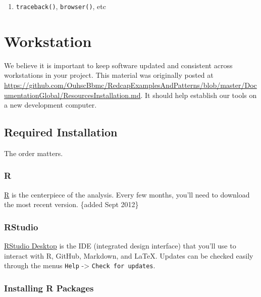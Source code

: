 \documentclass[
]{book}
\providecommand{\tightlist}{%
  \setlength{\itemsep}{0pt}\setlength{\parskip}{0pt}}
\begin{document}
\begin{enumerate}
\def\labelenumi{\arabic{enumi}.}
\tightlist
\item
  \texttt{traceback()}, \texttt{browser()}, etc
\end{enumerate}

\hypertarget{workstation}{%
\chapter{Workstation}\label{workstation}}

We believe it is important to keep software updated and consistent across workstations in your project. This material was originally posted at \url{https://github.com/OuhscBbmc/RedcapExamplesAndPatterns/blob/master/DocumentationGlobal/ResourcesInstallation.md}. It should help establish our tools on a new development computer.

\hypertarget{installation-required}{%
\section{Required Installation}\label{installation-required}}

The order matters.

\hypertarget{r}{%
\subsection{R}\label{r}}

\href{http://cran.r-project.org/}{R} is the centerpiece of the analysis. Every few months, you'll need to download the most recent version. \{added Sept 2012\}

\hypertarget{rstudio}{%
\subsection{RStudio}\label{rstudio}}

\href{http://www.rstudio.com/ide/download/desktop}{RStudio Desktop} is the IDE (integrated design interface) that you'll use to interact with R, GitHub, Markdown, and LaTeX. Updates can be checked easily through the menus \texttt{Help} -\textgreater{} \texttt{Check\ for\ updates}.

\hypertarget{installing-r-packages}{%
\subsection{Installing R Packages}\label{installing-r-packages}}
\end{document}
